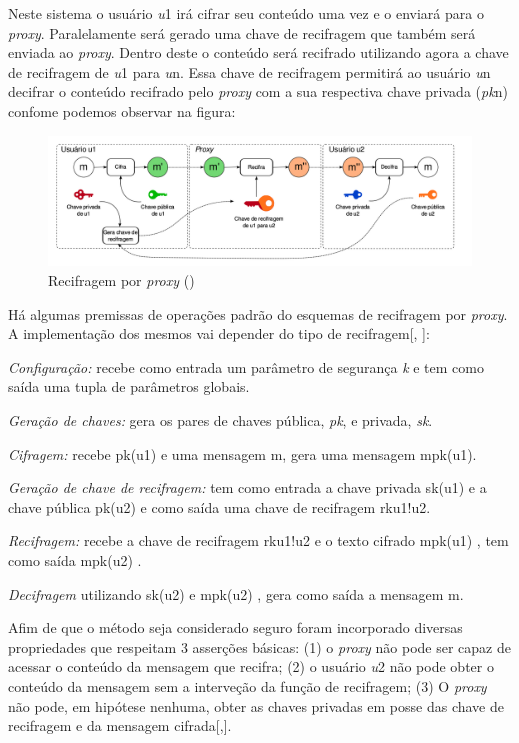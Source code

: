 Neste sistema o usuário \emph{u}1 irá cifrar seu conteúdo uma vez e o enviará para o \emph{proxy}. Paralelamente será gerado uma chave de recifragem que também será enviada ao \emph{proxy}. Dentro deste o conteúdo será recifrado utilizando agora a chave de recifragem de \emph{u}1 para \emph{u}n. Essa chave de recifragem permitirá ao usuário \emph{u}n decifrar o conteúdo recifrado pelo \emph{proxy} com a sua respectiva chave privada (\emph{pk}n) confome podemos observar na figura:
\begin{figure}[H]
\includegraphics[width=17cm]{Figuras/recifragemPorProxy.png}
\caption{Recifragem por \emph{proxy} (\cite{mannes2016controle})} 
\label{figura:contextualizacao} 
\end{figure}

Há algumas premissas de operações padrão do esquemas de recifragem por \emph{proxy}. A implementação dos mesmos vai depender do tipo de recifragem[\cite{ateniese2006improved}, \cite{chow2010efficient}]:

\textit{Configuração:} recebe como entrada um parâmetro de segurança \emph{k} e tem como saída uma tupla de parâmetros globais. 

\textit{Geração de chaves:} gera os pares de chaves pública, \emph{pk}, e privada, \emph{sk}.

\textit{Cifragem:} recebe pk(u1) e uma mensagem m, gera uma mensagem {m}pk(u1).

\textit{Geração de chave de recifragem:} tem como entrada a chave privada sk(u1) e a chave pública pk(u2) e como saída uma chave de recifragem rku1!u2.

\textit{Recifragem:} recebe a chave de recifragem rku1!u2 e o texto cifrado {m}pk(u1) , tem como saída {m}pk(u2) .

\textit{Decifragem} utilizando sk(u2) e {m}pk(u2) , gera como saída a mensagem m.

Afim de que o método seja considerado seguro foram incorporado diversas propriedades que respeitam 3 asserções básicas: (1) o \emph{proxy} não pode ser capaz de acessar o conteúdo da mensagem que recifra; (2) o usuário \emph{u}2 não pode obter o conteúdo da mensagem sem a interveção da função de recifragem; (3) O \emph{proxy} não pode, em hipótese nenhuma, obter as chaves privadas em posse das chave de recifragem e da mensagem cifrada[\cite{matsuo2007proxy},\cite{zhu2010new}].

